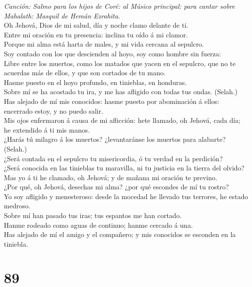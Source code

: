  \emph{Canción: Salmo para los hijos de Coré: al Músico
principal: para cantar sobre Mahalath: Masquil de Hemán Ezrahita.}\\
Oh Jehová, Dios de mi salud, día y noche clamo delante de ti.\\
 Entre mi oración en tu presencia: inclina tu oído á mi
clamor.\\
 Porque mi alma está harta de males, y mi vida cercana al
sepulcro.\\
 Soy contado con los que descienden al hoyo, soy como hombre
sin fuerza:\\
 Libre entre los muertos, como los matados que yacen en el
sepulcro, que no te acuerdas más de ellos, y que son cortados de tu
mano.\\
 Hasme puesto en el hoyo profundo, en tinieblas, en
honduras.\\
 Sobre mí se ha acostado tu ira, y me has afligido con todas
tus ondas. (Selah.)\\
 Has alejado de mí mis conocidos: hasme puesto por
abominación á ellos: encerrado estoy, y no puedo salir.\\
 Mis ojos enfermaron á causa de mi aflicción: hete llamado,
oh Jehová, cada día; he extendido á ti mis manos.\\
 ¿Harás tú milagro á los muertos? ¿levantaránse los muertos
para alabarte? (Selah.)\\
 ¿Será contada en el sepulcro tu misericordia, ó tu verdad
en la perdición?\\
 ¿Será conocida en las tinieblas tu maravilla, ni tu
justicia en la tierra del olvido?\\
 Mas yo á ti he clamado, oh Jehová; y de mañana mi oración
te previno.\\
 ¿Por qué, oh Jehová, desechas mi alma? ¿por qué escondes
de mí tu rostro?\\
 Yo soy afligido y menesteroso: desde la mocedad he llevado
tus terrores, he estado medroso.\\
 Sobre mí han pasado tus iras; tus espantos me han
cortado.\\
 Hanme rodeado como aguas de continuo; hanme cercado á
una.\\
 Has alejado de mí el amigo y el compañero; y mis conocidos
se esconden en la tiniebla.

\hypertarget{section-88}{%
\section{89}\label{section-88}}

